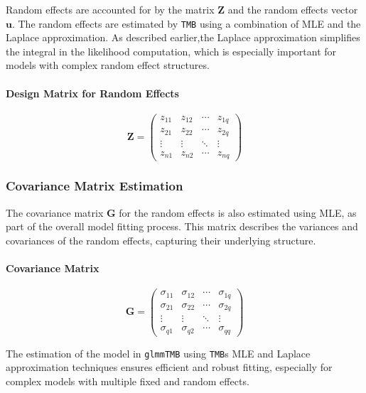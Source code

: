 \documentclass[12pt, twoside,hidelinks]{article}
\theoremstyle{definition}
\numberwithin{equation}{section}
\begin{document}
Random effects are accounted for by the matrix \( \mathbf{Z} \) and the random effects vector \( \boldsymbol{u} \). The random effects are estimated by \texttt{TMB} using a combination of MLE and the Laplace approximation. As described earlier,the Laplace approximation simplifies the integral in the likelihood computation, which is especially important for models with complex random effect structures.

\paragraph{Design Matrix for Random Effects}

\begin{equation}
\mathbf{Z} = \begin{pmatrix}
z_{11} & z_{12} & \cdots & z_{1q} \\
z_{21} & z_{22} & \cdots & z_{2q} \\
\vdots & \vdots & \ddots & \vdots \\
z_{n1} & z_{n2} & \cdots & z_{nq}
\end{pmatrix}
\end{equation}

\subsubsection{Covariance Matrix Estimation}

The covariance matrix \( \mathbf{G} \) for the random effects is also estimated using MLE, as part of the overall model fitting process. This matrix describes the variances and covariances of the random effects, capturing their underlying structure.

\paragraph{Covariance Matrix}

\begin{equation}
\mathbf{G} = \begin{pmatrix}
\sigma_{11} & \sigma_{12} & \cdots & \sigma_{1q} \\
\sigma_{21} & \sigma_{22} & \cdots & \sigma_{2q} \\
\vdots & \vdots & \ddots & \vdots \\
\sigma_{q1} & \sigma_{q2} & \cdots & \sigma_{qq}
\end{pmatrix}
\end{equation}

The estimation of the model in \texttt{glmmTMB} using \texttt{TMB}s MLE and Laplace approximation techniques ensures efficient and robust fitting, especially for complex models with multiple fixed and random effects.
\end{document}

